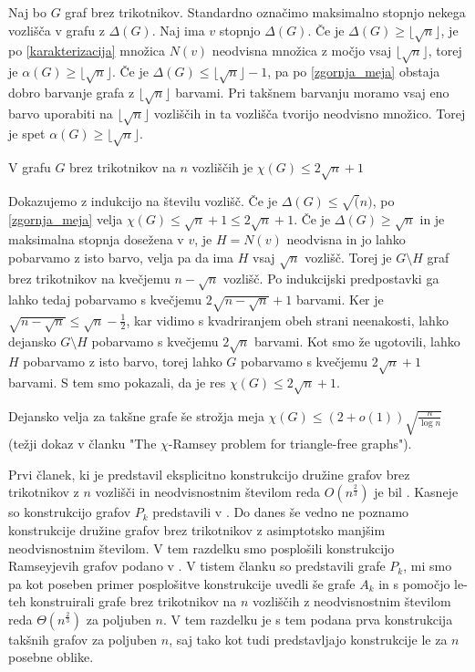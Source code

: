 \documentclass[mat1, tisk]{fmfdelo}
\begin{document}
    \begin{dokaz}
        Naj bo $G$ graf brez trikotnikov. Standardno označimo maksimalno stopnjo nekega vozlišča v grafu z $\Delta(G)$. Naj ima $v$ stopnjo $\Delta(G)$. Če je $\Delta(G) \geq \lfloor\sqrt{n}\rfloor$, je po \ref{karakterizacija} množica $N(v)$ neodvisna množica z močjo vsaj 
        $\lfloor\sqrt{n}\rfloor$, torej je $\alpha(G) \geq \lfloor\sqrt{n}\rfloor$. Če je $\Delta(G) \leq \lfloor\sqrt{n}\rfloor - 1$, pa po \ref{zgornja_meja} obstaja dobro barvanje grafa z $\lfloor\sqrt{n}\rfloor$ barvami. Pri takšnem barvanju moramo vsaj eno barvo uporabiti
        na $\lfloor\sqrt{n}\rfloor$ vozliščih in ta vozlišča tvorijo neodvisno množico. Torej je spet $\alpha(G) \geq \lfloor\sqrt{n}\rfloor$.
    \end{dokaz}

    \begin{trditev}
        V grafu $G$ brez trikotnikov na $n$ vozliščih je $\chi(G) \leq 2\sqrt{n} + 1$
    \end{trditev}

    \begin{dokaz}
        Dokazujemo z indukcijo na številu vozlišč. Če je $\Delta(G) \leq \sqrt(n)$, po \ref{zgornja_meja} velja $\chi(G) \leq \sqrt{n} + 1 \leq 2\sqrt{n} + 1$. Če je $\Delta(G) \geq \sqrt{n}$ in je maksimalna stopnja dosežena v $v$, je $H = N(v)$ neodvisna in jo lahko pobarvamo z isto barvo, velja
        pa da ima $H$ vsaj $\sqrt{n}$ vozlišč. Torej je $G \setminus H$ graf brez trikotnikov na kvečjemu $n - \sqrt{n}$ vozlišč. Po indukcijski predpostavki ga lahko tedaj pobarvamo s kvečjemu $2\sqrt{n - \sqrt{n}} + 1$ barvami. Ker je $\sqrt{n - \sqrt{n}} \leq \sqrt{n} - \frac{1}{2}$, kar vidimo
        s kvadriranjem obeh strani neenakosti, lahko dejansko $G \setminus H$ pobarvamo s kvečjemu $2\sqrt{n}$ barvami. Kot smo že ugotovili, lahko $H$ pobarvamo z isto barvo, torej lahko $G$ pobarvamo s kvečjemu $2\sqrt{n} + 1$ barvami. S tem smo pokazali, da je res $\chi(G) \leq 2\sqrt{n} + 1$.
    \end{dokaz}

Dejansko velja za takšne grafe še strožja meja $\chi(G) \leq (2 + o(1))\sqrt{\frac{n}{\log{n}}}$ (težji dokaz v članku "The $\chi$-Ramsey problem for triangle-free graphs").

Prvi članek, ki je predstavil eksplicitno konstrukcijo družine grafov brez trikotnikov z $n$ vozlišči in neodvisnostnim številom reda $O(n^{\frac{2}{3}})$ je bil \cite{Alon94}. Kasneje so konstrukcijo grafov $P_k$ predstavili v \cite{CodenottiPR00}. Do danes še vedno ne poznamo konstrukcije družine grafov brez trikotnikov
z asimptotsko manjšim neodvisnostnim številom. V tem razdelku smo posplošili konstrukcijo Ramseyjevih grafov podano v \cite{CodenottiPR00}. V tistem članku so predstavili grafe $P_k$, mi smo pa kot poseben primer posplošitve konstrukcije uvedli še grafe $A_k$ in s pomočjo le-teh konstruirali grafe brez
trikotnikov na $n$ vozliščih z neodvisnostnim številom reda $\Theta(n^{\frac{2}{3}})$ za poljuben $n$. V tem razdelku je s tem podana prva konstrukcija takšnih grafov za poljuben $n$, saj tako \cite{Alon94} kot tudi \cite{CodenottiPR00} predstavljajo konstrukcije le za $n$ posebne oblike.
\end{document}
